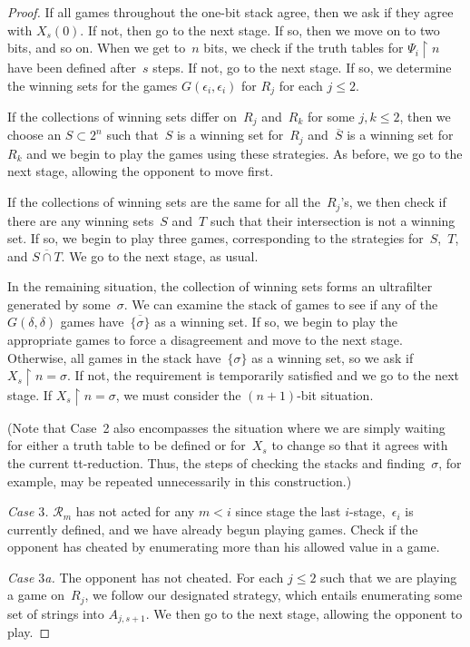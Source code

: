 \documentclass{LMCS}
\def\res{\!\!\upharpoonright\!}     \def\eres{\!\upharpoonright\!}     \def\nes{n_{e,s}}
\newcommand{\0}{\mathbf{0}}
\newcommand{\<}{\langle}
\renewcommand{\>}{\rangle}
\begin{document}
\begin{proof}
If all games throughout the one-bit stack agree, then we ask if they agree
with $X_s(0).$  If not, then go to the next stage.  If so, then we move on to
two bits, and so on.  When we get to~$n$ bits, we check if the truth tables
for $\Psi_i\res n$ have been defined after~$s$ steps.  If not, go to the next
stage.  If so, we determine the winning sets for the games $G(\epsilon_i,
\epsilon_i)$ for $R_j$ for each $j \le 2$.

If the collections of winning sets differ on~$R_j$ and~$R_k$ for some
\mbox{$j,k \le 2$}, then we choose an $S\subset 2^n$ such that~$S$ is a
winning set for~$R_j$ and~$\overline{S}$ is a winning set for~$R_k$ and we
begin to play the games using these strategies. As before, we go to the next
stage, allowing the opponent to move first.

If the collections of winning sets are the same for all the~$R_j$'s, we then
check if there are any winning sets~$S$ and~$T$ such that their intersection
is not a winning set.  If so, we begin to play three games, corresponding to
the strategies for~$S$,~$T$, and $\overline{S\cap T}$.  We go to the next
stage, as usual.

In the remaining situation, the collection of winning sets forms an
ultrafilter generated by some~$\sigma$.
We can examine the stack of games to see if any of the $G(\delta,\delta)$
games have~$\overline{\{\sigma\}}$ as a winning set.  If so, we begin to play
the appropriate games to force a disagreement and move to the next stage.
Otherwise, all games in the stack have~$\{\sigma\}$ as a winning set, so we
ask if $X_s\res n=\sigma$.  If not, the requirement is temporarily satisfied
and we go to the next stage.  If $X_s\res n=\sigma$, we must consider the
$(n+1)$-bit situation.

(Note that Case~2 also encompasses the situation where we are simply waiting
for either a truth table to be defined or for~$X_s$ to change so that it
agrees with the current tt-reduction.  Thus, the steps of checking the stacks
and finding~$\sigma$, for example, may be repeated unnecessarily in this
construction.)

\medskip
{\em Case $3$.} $\mathcal{R}_m$ has not acted for any $m<i$ since stage the
last $i$-stage,~$\epsilon_i$ is currently defined, and we have already begun
playing games.
Check if the opponent has cheated by enumerating more than his allowed value
in a game.

\smallskip
{\em Case $3$a.} The opponent has not cheated. For each $j \le 2$ such that we
are playing a game on~$R_j$, we follow our designated strategy, which entails
enumerating some set of strings into $A_{j,s+1}$.  We then go to the next
stage, allowing the opponent to play.




\end{proof}
\end{document}
